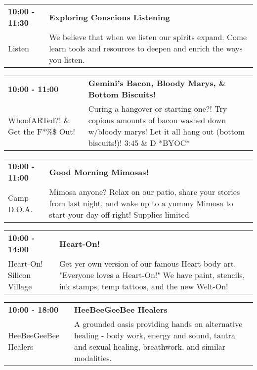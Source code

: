 \begin{tabular}{ p{1in} p{2.2in} }
    \textbf{10:00 - 11:30} & \textbf{Exploring Conscious Listening} \\
    Listen \newline  & We believe that when we listen our spirits expand. Come learn tools and resources to deepen and enrich the ways you listen. \\
    \hline 
\end{tabular}
    
\begin{tabular}{ p{1in} p{2.2in} }
    \textbf{10:00 - 11:00} & \textbf{Gemini's Bacon, Bloody Marys, \& Bottom Biscuits!} \\
    WhoofARTed?! \& Get the F*\%\$ Out! \newline  & Curing a hangover or starting one?! Try copious amounts of bacon washed down w/bloody marys! Let it all hang out (bottom biscuits!)! 3:45 \& D *BYOC* \\
    \hline 
\end{tabular}
    
\begin{tabular}{ p{1in} p{2.2in} }
    \textbf{10:00 - 11:00} & \textbf{Good Morning Mimosas!} \\
    Camp D.O.A. \newline  & Mimosa anyone? Relax on our patio, share your stories from last night, and wake up to a yummy Mimosa to start your day off right! Supplies limited \\
    \hline 
\end{tabular}
    
\begin{tabular}{ p{1in} p{2.2in} }
    \textbf{10:00 - 14:00} & \textbf{Heart-On!} \\
    Heart-On! \newline Silicon Village & Get yer own version of our famous Heart body art. "Everyone loves a Heart-On!" We have paint, stencils, ink stamps, temp tattoos, and the new Welt-On! \\
    \hline 
\end{tabular}
    
\begin{tabular}{ p{1in} p{2.2in} }
    \textbf{10:00 - 18:00} & \textbf{HeeBeeGeeBee Healers} \\
    HeeBeeGeeBee Healers \newline  & A grounded oasis providing hands on alternative healing - body work, energy and sound, tantra and sexual healing, breathwork, and similar modalities. \\
    \hline 
\end{tabular}
    
